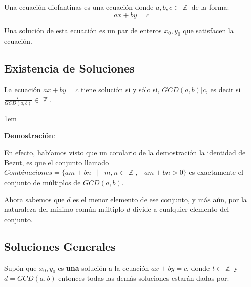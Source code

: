\documentclass[12pt, fleqn]{report}                             %
\newenvironment{SmallIndentation}[1][0.75em]                    %
    {\begin{adjustwidth}{#1}{}\begin{footnotesize}}                 %
    {\end{footnotesize}\end{adjustwidth}}                           %
\DeclareMathOperator \Space {\quad}                             %
\DeclareMathOperator \MiniSpace {\;}                            %
\newcommand \Such {\MiniSpace|\MiniSpace}                       %
\DeclareMathOperator \Integers  {\mathbb{Z}}                     %
\begin{document}
            Una ecuación diofantinas es una ecuación donde $a,b,c \in \Integers$ de
            la forma:
            \begin{equation}
                ax + by = c
            \end{equation}

            Una solución de esta ecuación es un par de enteros $x_0, y_0$
            que satisfacen la ecuación.


        \vspace{3.5em}
        \subsection{Existencia de Soluciones}

            La ecuación $ax + by = c$ tiene solución si y sólo si, $GCD(a,b)|c$, es decir
            si $\frac{c}{GCD(a,b)} \in \Integers$.

            \begin{SmallIndentation}[1em]
                \textbf{Demostración}:

                En efecto, habíamos visto que un corolario de la demostración la identidad de Bezut,
                es que el conjunto llamado
                $Combinaciones = \{ am+bn \Such m, n \in \Integers, \MiniSpace am+bn > 0 \}$
                es exactamente el conjunto de múltiplos de $GCD(a, b)$.

                Ahora sabemos que $d$ es el menor elemento de ese conjunto, y más aún,
                por la naturaleza del mínimo común múltiplo $d$ divide a cualquier
                elemento del conjunto.

            \end{SmallIndentation}


        \clearpage
        \subsection{Soluciones Generales}

            Supón que $x_0, y_0$ es \textbf{una} solución a la ecuación $ax+ by = c$,
            donde $t \in \Integers$ y $d=GCD(a,b)$ entonces todas las demás soluciones
            estarán dadas por:
\end{document}

